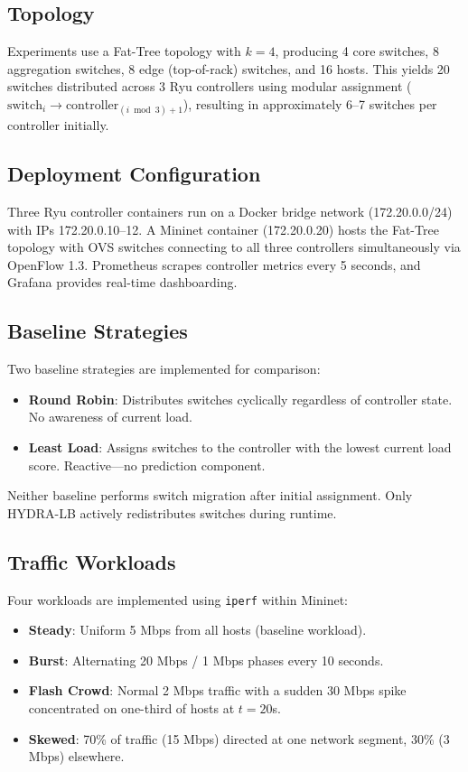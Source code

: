 \documentclass[conference]{IEEEtran}
\begin{document}
\subsection{Topology}

Experiments use a Fat-Tree topology with $k=4$, producing 4 core switches, 8 aggregation switches, 8 edge (top-of-rack) switches, and 16 hosts. This yields 20 switches distributed across 3 Ryu controllers using modular assignment ($\text{switch}_i \rightarrow \text{controller}_{(i \bmod 3) + 1}$), resulting in approximately 6--7 switches per controller initially.

\subsection{Deployment Configuration}

Three Ryu controller containers run on a Docker bridge network (172.20.0.0/24) with IPs 172.20.0.10--12. A Mininet container (172.20.0.20) hosts the Fat-Tree topology with OVS switches connecting to all three controllers simultaneously via OpenFlow 1.3. Prometheus scrapes controller metrics every 5 seconds, and Grafana provides real-time dashboarding.

\subsection{Baseline Strategies}

Two baseline strategies are implemented for comparison:
\begin{itemize}
    \item \textbf{Round Robin}: Distributes switches cyclically regardless of controller state. No awareness of current load.
    \item \textbf{Least Load}: Assigns switches to the controller with the lowest current load score. Reactive---no prediction component.
\end{itemize}
Neither baseline performs switch migration after initial assignment. Only HYDRA-LB actively redistributes switches during runtime.

\subsection{Traffic Workloads}

Four workloads are implemented using \texttt{iperf} within Mininet:
\begin{itemize}
    \item \textbf{Steady}: Uniform 5 Mbps from all hosts (baseline workload).
    \item \textbf{Burst}: Alternating 20 Mbps / 1 Mbps phases every 10 seconds.
    \item \textbf{Flash Crowd}: Normal 2 Mbps traffic with a sudden 30 Mbps spike concentrated on one-third of hosts at $t=20$s.
    \item \textbf{Skewed}: 70\% of traffic (15 Mbps) directed at one network segment, 30\% (3 Mbps) elsewhere.
\end{itemize}
\end{document}
